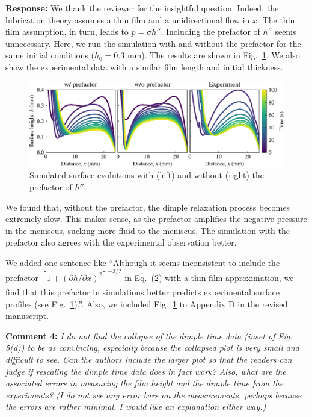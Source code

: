 \documentclass[11pt]{article}
\newif\ifhighlight
\newcommand{\hl}[1]{\ifhighlight\textcolor{blue}{#1}\else#1\fi}
\begin{document}
\textbf{Response:} We thank the reviewer for the insightful question. Indeed, the lubrication theory assumes a thin film and a unidirectional flow in $x$. 
The thin film assumption, in turn, leads to $p=\sigma h''$. Including the prefactor of $h''$ seems unnecessary. 
Here, we run the simulation with and without the prefactor for the same initial conditions ($h_0=0.3$ mm). The results are shown in Fig.~\ref{fig:prefactor}. 
We also show the experimental data with a similar film length and initial thickness.

\begin{figure}[ht]
    \centering
    \includegraphics[width=0.9\linewidth]{Figures/prefactor.pdf}
    \caption{Simulated surface evolutions with (left) and without (right) the prefactor of $h''$.}
    \label{fig:prefactor}
\end{figure}

We found that, without the prefactor, the dimple relaxation process becomes extremely slow. 
This makes sense, as the prefactor amplifies the negative pressure in the meniscus, sucking more fluid to the meniscus. 
The simulation with the prefactor also agrees with the experimental observation better. 

\hl{We added one sentence like ``Although it seems inconsistent to include the prefactor $[1+(\partial h/\partial x)^2]^{-3/2}$ in Eq.~(2) with a thin film approximation, we find that this prefactor in simulations better predicts experimental surface profiles (see Fig.~\ref{fig:prefactor}).''. Also, we included Fig.~\ref{fig:prefactor} to Appendix D in the revised manuscript.}

\bigskip
\begin{siderules}
\textbf{Comment 4:} \textit{I do not find the collapse of the dimple time data (inset of Fig. 5(d)) to be as convincing, especially because the collapsed plot is very small and difficult to see. Can the authors include the larger plot so that the readers can judge if rescaling the dimple time data does in fact work? Also, what are the associated errors in measuring the film height and the dimple time from the experiments? (I do not see any error bars on the measurements, perhaps because the errors are rather minimal. I would like an explanation either way.)}
\end{siderules}
\end{document}
